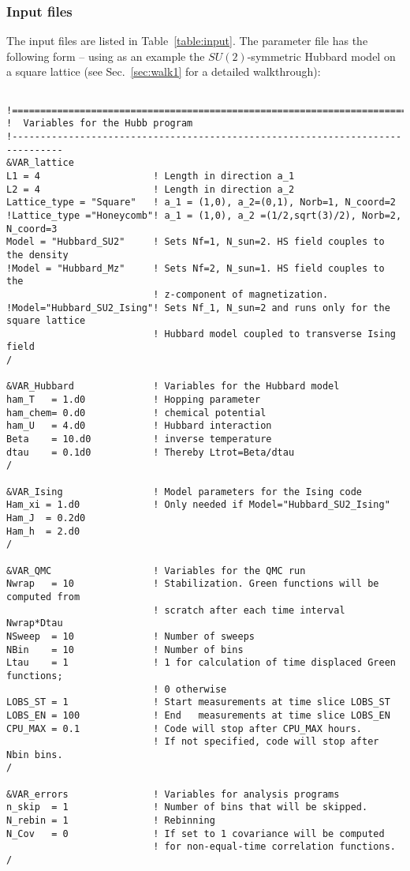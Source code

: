\subsubsection{Input files}\label{sec:input}
%

The input files are listed in Table~\ref{table:input}. 
The parameter file  has the following form --
using as an example  the $SU(2)$-symmetric Hubbard model on a square lattice (see Sec.~\ref{sec:walk1} for a detailed walkthrough):
%
\begin{lstlisting}[style=fortran]

!===============================================================================
!  Variables for the Hubb program
!-------------------------------------------------------------------------------
&VAR_lattice
L1 = 4                    ! Length in direction a_1
L2 = 4                    ! Length in direction a_2
Lattice_type = "Square"	  ! a_1 = (1,0), a_2=(0,1), Norb=1, N_coord=2
!Lattice_type ="Honeycomb"! a_1 = (1,0), a_2 =(1/2,sqrt(3)/2), Norb=2, N_coord=3
Model = "Hubbard_SU2"     ! Sets Nf=1, N_sun=2. HS field couples to the density
!Model = "Hubbard_Mz"     ! Sets Nf=2, N_sun=1. HS field couples to the 
                          ! z-component of magnetization.  
!Model="Hubbard_SU2_Ising"! Sets Nf_1, N_sun=2 and runs only for the square lattice
                          ! Hubbard model coupled to transverse Ising field
/

&VAR_Hubbard              ! Variables for the Hubbard model
ham_T   = 1.d0            ! Hopping parameter
ham_chem= 0.d0            ! chemical potential
ham_U   = 4.d0            ! Hubbard interaction
Beta    = 10.d0           ! inverse temperature
dtau    = 0.1d0           ! Thereby Ltrot=Beta/dtau
/

&VAR_Ising                ! Model parameters for the Ising code
Ham_xi = 1.d0             ! Only needed if Model="Hubbard_SU2_Ising"
Ham_J  = 0.2d0
Ham_h  = 2.d0
/

&VAR_QMC                  ! Variables for the QMC run
Nwrap   = 10              ! Stabilization. Green functions will be computed from 
                          ! scratch after each time interval Nwrap*Dtau
NSweep  = 10              ! Number of sweeps
NBin    = 10              ! Number of bins
Ltau    = 1               ! 1 for calculation of time displaced Green functions;
                          ! 0 otherwise
LOBS_ST = 1               ! Start measurements at time slice LOBS_ST
LOBS_EN = 100             ! End   measurements at time slice LOBS_EN
CPU_MAX = 0.1             ! Code will stop after CPU_MAX hours. 
                          ! If not specified, code will stop after Nbin bins.
/

&VAR_errors               ! Variables for analysis programs
n_skip  = 1               ! Number of bins that will be skipped. 
N_rebin = 1               ! Rebinning  
N_Cov   = 0               ! If set to 1 covariance will be computed
                          ! for non-equal-time correlation functions.                   
/            
\end{lstlisting}
%


